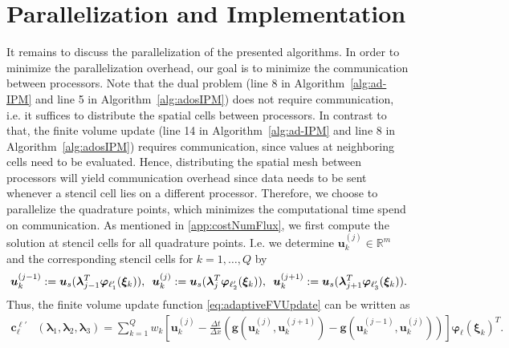 \section{Parallelization and Implementation}
\label{sec:parallel}
It remains to discuss the parallelization of the presented algorithms. In order to minimize the parallelization overhead, our goal is to minimize the communication between processors. Note that the dual problem (line 8 in Algorithm~\ref{alg:ad-IPM} and line 5 in Algorithm~\ref{alg:adosIPM}) does not require communication, i.e. it suffices to distribute the spatial cells between processors. In contrast to that, the finite volume update (line 14 in Algorithm~\ref{alg:ad-IPM} and line 8 in Algorithm~\ref{alg:adosIPM}) requires communication, since values at neighboring cells need to be evaluated. Hence, distributing the spatial mesh between processors will yield communication overhead since data needs to be sent whenever a stencil cell lies on a different processor. Therefore, we choose to parallelize the quadrature points, which minimizes the computational time spend on communication. As mentioned in \ref{app:costNumFlux}, we first compute the solution at stencil cells for all quadrature points. I.e. we determine $\bm u^{(j)}_k\in\mathbb{R}^m$ and the corresponding stencil cells for $k = 1,\dots,Q$ by
\begin{align*}
\bm u^{(j-1)}_k := \bm u_{s}(\bm{\lambda}_{j-1}^T\bm{\varphi}_{\ell_1'}(\bm \xi_k)), \enskip \bm u^{(j)}_k := \bm u_{s}(\bm{\lambda}_{j}^T\bm{\varphi}_{\ell_2'}(\bm \xi_k)), \enskip \bm u^{(j+1)}_k := \bm u_{s}(\bm{\lambda}_{j+1}^T\bm{\varphi}_{\ell_3'}(\bm \xi_k)).
\end{align*}
Thus, the finite volume update function \eqref{eq:adaptiveFVUpdate} can be written as
\begin{align}\label{eq:momentUpQuadrature}
\bm{c}_{\ell}^{\bm{\ell}'}&\left(\bm{\lambda}_{1},\bm{\lambda}_2,\bm{\lambda}_3\right)=\sum_{k=1}^Q w_k \left[\bm u^{(j)}_k- \frac{\Delta t}{\Delta x}\left(\bm g( \bm u^{(j)}_k,\bm u^{(j+1)}_k )- \bm g( \bm u^{(j-1)}_k,\bm u^{(j)}_k )\right)\right]\bm{\varphi}_{\ell}(\bm \xi_k)^T.
\end{align}
